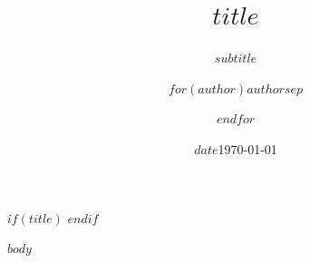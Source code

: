 \documentclass[aspectratio=169,10pt]{beamer}
\title{$title$}
\subtitle{$subtitle$}
\author{$for(author)$$author$$sep$ \and $endfor$}
\date{$date$}
\date{\today}
\institute{$institute$}
\begin{document}
$if(title)$
\frame{\titlepage}
$endif$

$body$
\end{document}
